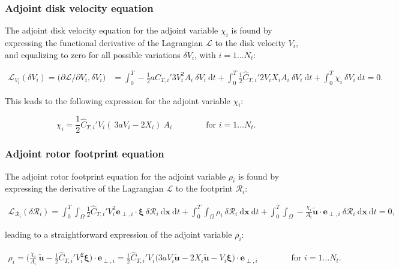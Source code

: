 \documentclass[energies,article,submit,moreauthors,latex,10pt,a4paper]{mdpi}
\newcommand{\bs}[1]{\boldsymbol{#1}}
\newcommand{\dx}{\text{d}\boldsymbol{x}}
\newcommand{\dt}{\text{d}t}
\newcommand{\stint}{\int_{0}^{T} \int_{\Omega}}
\newcommand{\Tint}{\int_{0}^{T}}
\newcommand{\utilde}{\widetilde{\bs{u}}}
\newcommand{\ctihat}{\widehat{C}_{T,i}'}
\newcommand{\R}{\mathscr{R}}
\newcommand{\Lagr}{\mathscr{L}}
\newcommand{\eperpi}{\bs{e}_{\perp,i}}
\newcommand{\innerproductsmall}[2]{\big( #1, #2 \big)}
\begin{document}
\subsubsection{Adjoint disk velocity equation}
\noindent The adjoint disk velocity equation for the adjoint variable $\chi_i$ is found by expressing the functional derivative of the Lagrangian $\Lagr$ to the disk velocity $V_i$, and equalizing to zero for all possible variations $\delta V_i$, with $i = 1 \dots N_t$: 

\begin{align}
\Lagr_{V_i}(\delta V_i) = \innerproductsmall{\partial \Lagr / \partial V_i}{\delta V_i} &= \Tint -\frac{1}{2} a \ctihat 3 V_i^2 A_i ~\delta V_i ~\dt  + \Tint \frac{1}{2} \ctihat 2 V_i X_i  A_i ~\delta V_i ~\dt + \Tint \chi_i~ \delta V_i ~\dt = 0. 
\end{align}

\noindent This leads to the following expression for the adjoint variable $\chi_i$:

\begin{equation}\label{eq:chi_i}
\chi_i = \frac{1}{2} \ctihat V_i (~3a V_i - 2 X_i )~A_i \qquad\qquad \text{for } i=1\dots N_t. 
\end{equation}

\subsubsection{Adjoint rotor footprint equation}
\noindent The adjoint rotor footprint equation for the adjoint variable $\rho_i$ is found by expressing the derivative of the Lagrangian $\Lagr$ to the footprint $\R_i$: 

\begin{align}
\Lagr_{\R_i}(\delta \R_i) = \stint \frac{1}{2} \ctihat V_i^2 \eperpi \cdot \bs{\xi} ~\delta \R_i ~\dx ~ \dt + \stint \rho_i ~\delta \R_i ~\dx ~\dt + \stint -\frac{\chi_i}{A_i} \utilde \cdot \eperpi ~\delta \R_i ~\dx ~\dt = 0,
\end{align}    

\noindent leading to a straightforward expression of the adjoint variable $\rho_i$:

\begin{align}
\rho_i = \bigg( \frac{\chi_i}{A_i}~\utilde - \frac{1}{2} \ctihat V_i^2 \bs{\xi} \bigg) \cdot \eperpi = \frac{1}{2} \ctihat V_i \bigg(3aV_i \utilde  -2 X_i \utilde - V_i\bs{\xi} \bigg) \cdot \eperpi \qquad\qquad \text{for } i=1\dots N_t. \label{eq:rho_i}
\end{align}
\end{document}
